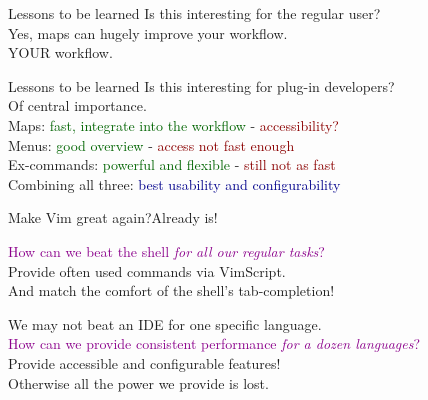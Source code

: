 \documentclass{beamer}
\begin{document}
\begin{frame}{Lessons to be learned}{}
	Is this interesting for the regular user? \\
	\vspace{3mm}
	\textrightarrow \hspace{1mm} Yes, maps can hugely improve your workflow. \\[1mm]
	YOUR workflow.
\end{frame}

\begin{frame}{Lessons to be learned}{}
	Is this interesting for plug-in developers? \\
	\vspace{3mm}
	\textrightarrow \hspace{1mm} Of central importance.\\
	\vspace{5mm}
	\pause
	Maps: \textcolor{darkgreen}{fast, integrate into the workflow} - \textcolor{darkred}{accessibility?} \\
	Menus: \textcolor{darkgreen}{good overview} - \textcolor{darkred}{access not fast enough} \\
	Ex-commands: \textcolor{darkgreen}{powerful and flexible} - \textcolor{darkred}{still not as fast} \\
	\vspace{2mm}
	\pause
	Combining all three: \textcolor{darkblue}{best usability and configurability}
\end{frame}

\begin{frame}{Make Vim great again?}{Already is!}

	\textcolor{darkmagenta}{How can we beat the shell \textit{for all our regular tasks}?} \\
	\vspace{2mm}
	\pause
	Provide often used commands via VimScript. \\
	And match the comfort of the shell's tab-completion! \\

	\vspace{5mm}
	\pause

	We may not beat an IDE for one specific language.\\
	\vspace{1mm}
	\textcolor{darkmagenta}{How can we provide consistent performance \textit{for a dozen languages}?} \\
	\vspace{2mm}
	\pause
	Provide accessible and configurable features! \\
	Otherwise all the power we provide is lost.

\end{frame}
\end{document}
